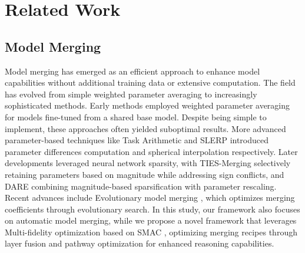 \section{Related Work}
\subsection{Model Merging}
Model merging has emerged as an efficient approach to enhance model capabilities without additional training data or extensive computation. The field has evolved from simple weighted parameter averaging to increasingly sophisticated methods. Early methods employed weighted parameter averaging  \citep{utans1996weight} for models fine-tuned from a shared base model. Despite being simple to implement, these approaches often yielded suboptimal results. More advanced parameter-based techniques like Task Arithmetic \citep{ilharco2022editing} and SLERP \citep{white2016sampling} introduced parameter differences computation and spherical interpolation respectively. Later developments leveraged neural network sparsity, with TIES-Merging \citep{yadav2024ties} selectively retaining parameters based on magnitude while addressing sign conflicts, and DARE \citep{yu2024language} combining magnitude-based sparsification with parameter rescaling. Recent advances include Evolutionary model merging \citep{akiba2024evolutionary}, which optimizes merging coefficients through evolutionary search. In this study, our framework also focuses on automatic model merging, while we propose a novel framework that leverages Multi-fidelity optimization \citep{peherstorfer2018survey} based on SMAC \citep{JMLR:v23:21-0888}, optimizing merging recipes through layer fusion and pathway optimization for enhanced reasoning capabilities.



